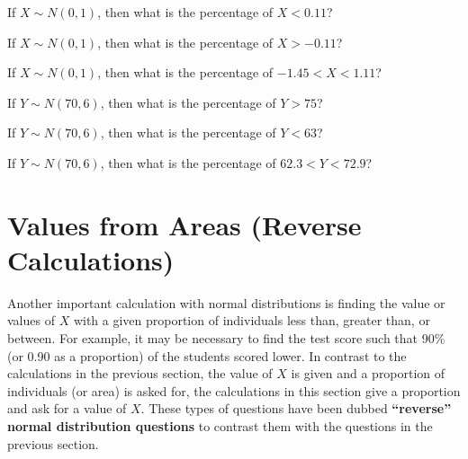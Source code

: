 \documentclass[10pt,openany]{book}\usepackage[]{graphicx}\usepackage[]{color}
\begin{document}
\begin{exsection}
  \item \label{revex:quNormZ0.11} If $X\sim N(0,1)$, then what is the percentage of $X<0.11$? 
  \item \label{revex:quNormZm0.11} If $X\sim N(0,1)$, then what is the percentage of $X>-0.11$? 
  \item \label{revex:quNormZbtwn} If $X\sim N(0,1)$, then what is the percentage of $-1.45<X<1.11$? 
  \item \label{revex:quNormXgt75} If $Y\sim N(70,6)$, then what is the percentage of $Y>75$? 
  \item \label{revex:quNormXlt63} If $Y\sim N(70,6)$, then what is the percentage of $Y<63$? 
  \item \label{revex:quNormXbtwn} If $Y\sim N(70,6)$, then what is the percentage of $62.3<Y<72.9$? 
\end{exsection}


\section[Reverse Calculations]{Values from Areas (Reverse Calculations)}
Another important calculation with normal distributions is finding the value or values of $X$ with a given proportion of individuals less than, greater than, or between.  For example, it may be necessary to find the test score such that 90\% (or 0.90 as a proportion) of the students scored lower.  In contrast to the calculations in the previous section, the value of $X$ is given and a proportion of individuals (or area) is asked for, the calculations in this section give a proportion and ask for a value of $X$.  These types of questions have been dubbed \textbf{``reverse'' normal distribution questions} to contrast them with the questions in the previous section.
\end{document}
